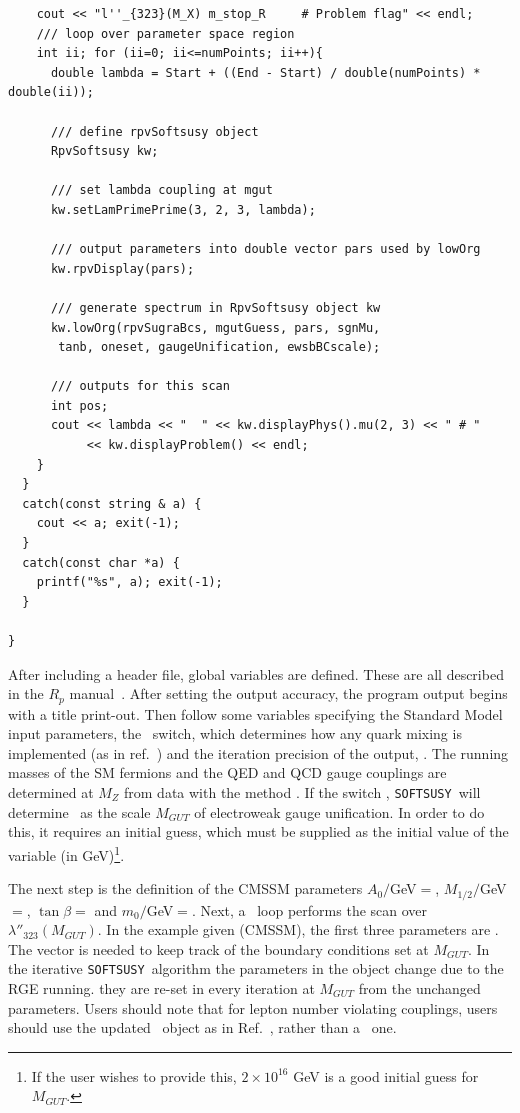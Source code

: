 \documentclass[final,3p,times,pdflatex]{elsarticle}
\def\SOFTSUSY{{\tt SOFTSUSY}}
\begin{document}
\begin{verbatim}
    cout << "l''_{323}(M_X) m_stop_R     # Problem flag" << endl;
    /// loop over parameter space region
    int ii; for (ii=0; ii<=numPoints; ii++){
      double lambda = Start + ((End - Start) / double(numPoints) * double(ii));
      
      /// define rpvSoftsusy object
      RpvSoftsusy kw;
      
      /// set lambda coupling at mgut
      kw.setLamPrimePrime(3, 2, 3, lambda); 
      
      /// output parameters into double vector pars used by lowOrg
      kw.rpvDisplay(pars);
      
      /// generate spectrum in RpvSoftsusy object kw
      kw.lowOrg(rpvSugraBcs, mgutGuess, pars, sgnMu,
       tanb, oneset, gaugeUnification, ewsbBCscale);
      
      /// outputs for this scan
      int pos;
      cout << lambda << "  " << kw.displayPhys().mu(2, 3) << " # " 
           << kw.displayProblem() << endl;
    }
  }
  catch(const string & a) {
    cout << a; exit(-1);
  }
  catch(const char *a) {
    printf("%s", a); exit(-1);
  }
  
}
\end{verbatim}
\normalsize
After including a header file, global variables are defined. These are all
described in the $R_p$ manual~\cite{Allanach:2001kg}.
After setting the output accuracy, 
the program output begins with a title print-out. Then follow
some variables specifying the Standard Model input parameters, the
~switch, which determines how any quark mixing is implemented
(as in ref.~\cite{Allanach:2001kg}) and
the iteration precision of the output, .
The running masses of the SM fermions and the QED and QCD gauge couplings are
determined at $M_Z$ from data with the method .
If the switch , \SOFTSUSY~will
determine ~as the scale $M_{GUT}$ of electroweak gauge
unification. In order to do 
this, it requires an initial guess, which must be 
supplied as the initial value of the variable  (in
GeV)\footnote{If the user wishes to provide 
  this, $2 \times 10^{16}$ GeV is a good initial
guess for $M_{GUT}$.}.

The next step is the definition of the CMSSM parameters $A_0/$GeV$=$,
$M_{1/2}/$GeV$=$, $\tan \beta=$ and
$m_0/$GeV$=$. Next, a ~loop performs the scan over
$\lambda''_{323}(M_{GUT})$. 
In the example given (CMSSM), the first three parameters are
. The  vector is
needed to keep track 
of the boundary conditions set at $M_{GUT}$.
In the iterative \SOFTSUSY~algorithm
the parameters in the  
object change due to
the RGE running\@.
they are re-set in
every iteration at $M_{GUT}$ from the unchanged ~
parameters. Users should note that for lepton number violating couplings,
users should use the updated ~object as in
Ref.~\cite{rpvneut}, rather than a 
~one.
\end{document}
